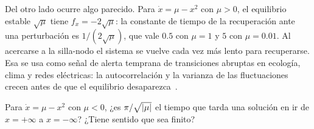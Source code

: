 Del otro lado ocurre algo parecido. Para $\dot x=\mu-x^2$ con $\mu>0$, el equilibrio estable $\sqrt\mu$ tiene $f_x=-2\sqrt\mu$: la constante de tiempo de la recuperación ante una perturbación es $1/(2\sqrt\mu)$, que vale $0.5$ con $\mu=1$ y $5$ con $\mu=0.01$. Al acercarse a la silla-nodo el sistema se vuelve cada vez más lento para recuperarse. Esa  se usa como señal de alerta temprana de transiciones abruptas en ecología, clima y redes eléctricas: la autocorrelación y la varianza de las fluctuaciones crecen antes de que el equilibrio desaparezca~\citep{SBBB09}.

\begin{pausa}
Para $\dot x=\mu-x^2$ con $\mu<0$, ¿es $\pi/\sqrt{\left\lvert \mu\right\rvert}$ el tiempo que tarda una solución en ir de $x=+\infty$ a $x=-\infty$? ¿Tiene sentido que sea finito?
\end{pausa}
